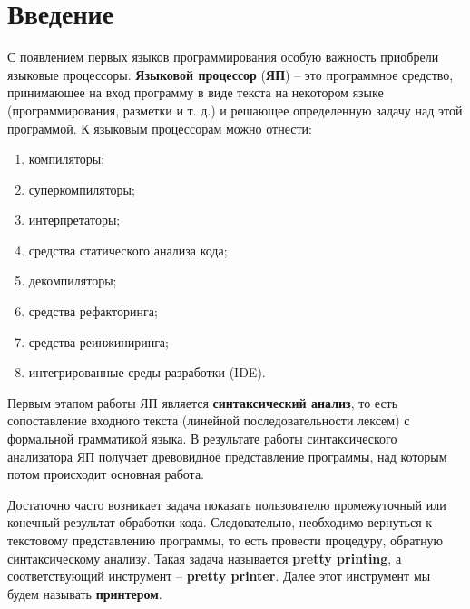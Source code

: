 \section*{Введение}


С появлением первых языков программирования особую важность приобрели языковые процессоры. \textbf{Языковой процессор} (\textbf{ЯП}) -- это программное средство, принимающее на вход программу в виде текста на некотором языке (программирования, разметки и т. д.) и решающее определенную задачу над этой программой. К языковым процессорам можно отнести:
\begin{enumerate}
\item компиляторы;
\item суперкомпиляторы;
\item интерпретаторы;
\item средства статического анализа кода;
\item декомпиляторы;
\item средства рефакторинга;
\item средства реинжиниринга;
\item интегрированные среды разработки (IDE).
\end{enumerate}

Первым этапом работы ЯП является \textbf{синтаксический анализ}, то есть сопоставление входного текста (линейной последовательности лексем) с формальной грамматикой языка. В результате работы синтаксического анализатора ЯП получает древовидное представление программы, над которым потом происходит основная работа.

Достаточно часто возникает задача показать пользователю промежуточный или конечный результат обработки кода.
Следовательно, необходимо вернуться к текстовому представлению программы, то есть провести процедуру, обратную синтаксическому анализу. Такая задача называется \textbf{pretty printing}, а соответствующий инструмент -- \textbf{pretty printer}. Далее этот инструмент мы будем называть \textbf{принтером}.

